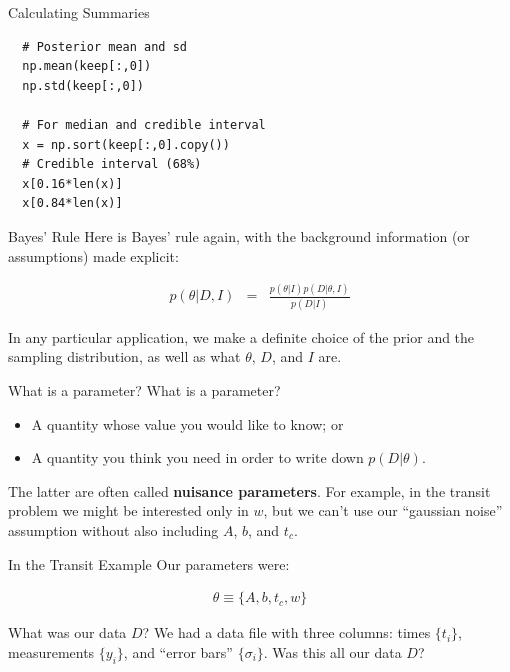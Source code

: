 \begin{frame}[t, fragile]{Calculating Summaries}
\begin{verbatim}
  # Posterior mean and sd
  np.mean(keep[:,0])
  np.std(keep[:,0])

  # For median and credible interval
  x = np.sort(keep[:,0].copy())
  # Credible interval (68%)
  x[0.16*len(x)]
  x[0.84*len(x)]
\end{verbatim}
\end{frame}

\begin{frame}[t]{Bayes' Rule}
Here is Bayes' rule again, with the background information (or assumptions)
made explicit:

\begin{eqnarray*}
p(\theta | D, I) &=& \frac{p(\theta | I)p(D | \theta, I)}{p(D | I)}
\end{eqnarray*}

In any particular application, we make a definite choice of the prior and
the sampling distribution, as well as what $\theta$, $D$, and $I$ are.

\end{frame}


\begin{frame}[t]{What is a parameter?}
What is a parameter?

\begin{itemize}
\item A quantity whose value you would like to know; or
\item A quantity you think you need in order to write down
$p(D | \theta)$.
\end{itemize}

The latter are often called {\bf nuisance parameters}.
For example, in the transit problem we might be interested only in $w$, but
we can't use our ``gaussian noise'' assumption without also including $A$, $b$,
and $t_c$.
\end{frame}




\begin{frame}[t]{In the Transit Example}
Our parameters were:

\begin{eqnarray*}
\theta \equiv \{A, b, t_c, w\}
\end{eqnarray*}

What was our data $D$? We had a data file with three columns: times $\{t_i\}$,
measurements $\{y_i\}$, and ``error bars'' $\{\sigma_i\}$. Was this all our
data $D$?

\end{frame}

